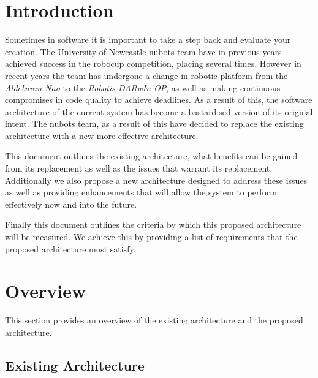 \documentclass[english,12pt]{scrartcl}
\begin{document}
	\clearpage
		
	\section{Introduction}
		Sometimes in software it is important to take a step back and evaluate your creation.
		The University of Newcastle \gls{nubots} team have in previous years achieved success in the \gls{robocup} competition, placing several times.
		However in recent years the team has undergone a change in robotic platform from the \emph{Aldebaran Nao} to the \emph{Robotis DARwIn-OP}, as well as making continuous compromises in code quality to achieve deadlines.
		As a result of this, the software architecture of the current system has become a bastardised version of its original intent.
		The \gls{nubots} team, as a result of this have decided to replace the existing architecture with a new more effective architecture.
		
		This document outlines the existing architecture, what benefits can be gained from its replacement as well as the issues that warrant its replacement.
		Additionally we also propose a new architecture designed to address these issues as well as providing enhancements that will allow the system to perform effectively now and into the future.
		
		Finally this document outlines the criteria by which this proposed architecture will be measured. 
		We achieve this by providing a list of requirements that the proposed architecture must satisfy.

	\section{Overview}
		This section provides an overview of the existing architecture and the proposed architecture.

		\subsection{Existing Architecture}
\end{document}
